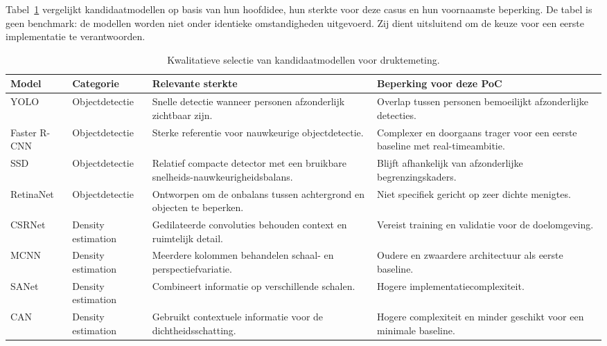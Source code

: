 Tabel~\ref{tab:long-list-modellen} vergelijkt kandidaatmodellen op basis van hun hoofdidee, hun sterkte voor deze casus en hun voornaamste beperking. De tabel is geen benchmark: de modellen worden niet onder identieke omstandigheden uitgevoerd. Zij dient uitsluitend om de keuze voor een eerste implementatie te verantwoorden.

\begin{table}[htbp]
    \centering
    \small
    \begin{tabular}{|p{2.4cm}|p{2.6cm}|p{4.2cm}|p{4.1cm}|}
        \hline
        \textbf{Model} & \textbf{Categorie} & \textbf{Relevante sterkte} & \textbf{Beperking voor deze PoC} \\
        \hline
        YOLO \autocite{Redmon2016} & Objectdetectie & Snelle detectie wanneer personen afzonderlijk zichtbaar zijn. & Overlap tussen personen bemoeilijkt afzonderlijke detecties. \\
        \hline
        Faster R-CNN & Objectdetectie & Sterke referentie voor nauwkeurige objectdetectie. & Complexer en doorgaans trager voor een eerste baseline met real-timeambitie. \\
        \hline
        SSD & Objectdetectie & Relatief compacte detector met een bruikbare snelheids-nauwkeurigheidsbalans. & Blijft afhankelijk van afzonderlijke begrenzingskaders. \\
        \hline
        RetinaNet & Objectdetectie & Ontworpen om de onbalans tussen achtergrond en objecten te beperken. & Niet specifiek gericht op zeer dichte menigtes. \\
        \hline
        CSRNet \autocite{Li2018} & Density estimation & Gedilateerde convoluties behouden context en ruimtelijk detail. & Vereist training en validatie voor de doelomgeving. \\
        \hline
        MCNN \autocite{Zhang2016} & Density estimation & Meerdere kolommen behandelen schaal- en perspectiefvariatie. & Oudere en zwaardere architectuur als eerste baseline. \\
        \hline
        SANet & Density estimation & Combineert informatie op verschillende schalen. & Hogere implementatiecomplexiteit. \\
        \hline
        CAN & Density estimation & Gebruikt contextuele informatie voor de dichtheidsschatting. & Hogere complexiteit en minder geschikt voor een minimale baseline. \\
        \hline
    \end{tabular}
    \caption[Selectie van kandidaatmodellen]{Kwalitatieve selectie van kandidaatmodellen voor druktemeting.}
    \label{tab:long-list-modellen}
\end{table}

